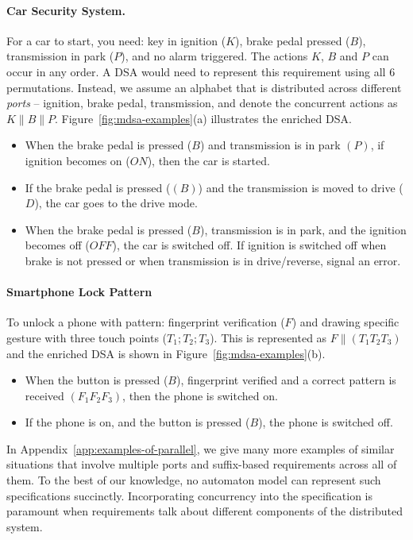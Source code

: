    \paragraph*{Car Security System.} For a car to start, you need: key in ignition ($K$), brake pedal pressed ($B$), transmission in park ($P$), and no alarm triggered. The actions $K$, $B$ and $P$ can occur in any order. A DSA would need to represent this requirement using all $6$ permutations. Instead, we assume an alphabet that is distributed across different \emph{ports} -- ignition, brake pedal, transmission, and denote the concurrent actions as $K \parallel B \parallel P$. Figure~\ref{fig:mdsa-examples}(a) illustrates the enriched DSA.

   \begin{itemize}
   \item When the brake pedal is pressed ($B$) and transmission is in park $(P)$, if ignition becomes on ($ON$), then the car is started.
   \item If the brake pedal is pressed ($(B)$) and the transmission is moved to drive ($D$), the car goes to the drive mode.
   \item When the brake pedal is pressed ($B$), transmission is in park, and the ignition becomes off ($OFF$), the car is switched off. If ignition is switched off when brake is not pressed or when transmission is in drive/reverse, signal an error.
   \end{itemize}

  
   \paragraph*{Smartphone Lock Pattern} To unlock a phone with pattern: fingerprint verification ($F$) and drawing specific gesture with three touch points ($T_1;T_2;T_3$). This is represented as $F \parallel (T_1 T_2 T_3)$ and the enriched DSA is shown in Figure~\ref{fig:mdsa-examples}(b).

   \begin{itemize}
   \item When the button is pressed ($B$), fingerprint verified and a correct pattern is received $(F_1 F_2 F_3)$, then the phone is switched on.
   \item If the phone is on, and the button is pressed ($B$), the phone is switched off.  
   \end{itemize}
   
  In Appendix~\ref{app:examples-of-parallel}, we give many more examples of similar situations that involve multiple ports and suffix-based requirements across all of them. To the best of our knowledge, no automaton model can represent such specifications succinctly. Incorporating concurrency into the specification is paramount when requirements talk about different components of the distributed system. 
  

